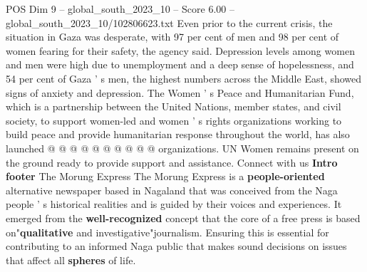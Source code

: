 \begin{textsample}{POS Dim 9 – global\_south\_2023\_10 – Score 6.00 – global\_south\_2023\_10/102806623.txt}
Even prior to the current crisis, the situation in Gaza was desperate, with 97 per cent of men and 98 per cent of women fearing for their safety, the agency said.
Depression levels among women and men were high due to unemployment and a deep sense of hopelessness, and 54 per cent of Gaza ' s men, the highest numbers across the Middle East, showed signs of anxiety and depression.
The Women ' s Peace and Humanitarian Fund, which is a partnership between the United Nations, member states, and civil society, to support women-led and women ' s rights organizations working to build peace and provide humanitarian response throughout the world, has also launched @ @ @ @ @ @ @ @ @ @ organizations.
UN Women remains present on the ground ready to provide support and assistance.
Connect with us \textbf{Intro} \textbf{footer} The Morung Express The Morung Express is a \textbf{people-oriented} alternative newspaper based in Nagaland that was conceived from the Naga people ' s historical realities and is guided by their voices and experiences.
It emerged from the \textbf{well-recognized} concept that the core of a free press is based on"\textbf{qualitative} and investigative"journalism.
Ensuring this is essential for contributing to an informed Naga public that makes sound decisions on issues that affect all \textbf{spheres} of life.

\end{textsample}
